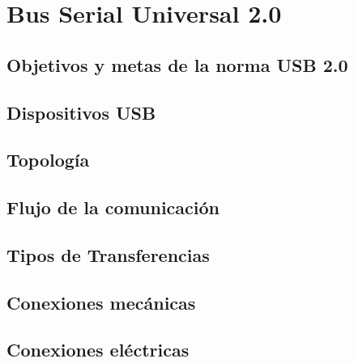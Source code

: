 \chapter{Bus Serial Universal 2.0}
	\label{cap:usb}
	
		\section{Objetivos y metas de la norma USB 2.0}
			\label{usb:ov}
			
		\section{Dispositivos USB}
		\section{Topología}
		\section{Flujo de la comunicación}
		\section{Tipos de Transferencias}
		\section{Conexiones mecánicas}
		\section{Conexiones eléctricas}